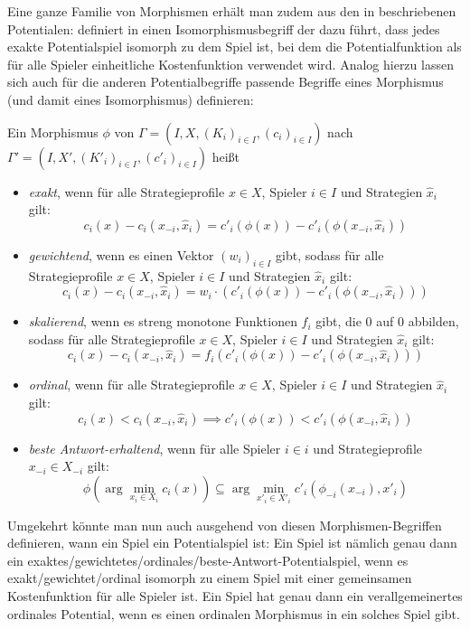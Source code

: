 Eine ganze Familie von Morphismen erhält man zudem aus den in  beschriebenen Potentialen: \citeauthor{ReprOfFiniteGamesAsNCG} definiert in \cite{ReprOfFiniteGamesAsNCG} einen Isomorphismusbegriff der dazu führt, dass jedes exakte Potentialspiel isomorph zu dem Spiel ist, bei dem die Potentialfunktion als für alle Spieler einheitliche Kostenfunktion verwendet wird. Analog hierzu lassen sich auch für die anderen Potentialbegriffe passende Begriffe eines Morphismus (und damit eines Isomorphismus) definieren:

\begin{defn}\label{def:PotentialMorphismen}
	Ein Morphismus $\phi$ von $\Gamma = (I, X, (K_i)_{i\in I}, (c_i)_{i\in I})$ nach $\Gamma' = (I, X', (K'_i)_{i\in I}, (c'_i)_{i\in I})$ heißt
	\begin{itemize}
		\item \emph{exakt}, wenn für alle Strategieprofile $x \in X$, Spieler $i \in I$ und Strategien $\hat{x}_i$ gilt:
			\[c_i(x) - c_i(x_{-i}, \hat{x}_i) = c'_i(\phi(x)) - c'_i(\phi(x_{-i}, \hat{x}_i))\]
		\item \emph{gewichtend}, wenn es einen Vektor $(w_i)_{i \in I}$ gibt, sodass für alle Strategieprofile $x \in X$, Spieler $i \in I$ und Strategien $\hat{x}_i$ gilt:
			\[c_i(x) - c_i(x_{-i}, \hat{x}_i) = w_i\cdot\left(c'_i(\phi(x)) - c'_i(\phi(x_{-i}, \hat{x}_i))\right)\]
		\item \emph{skalierend}, wenn es streng monotone Funktionen $f_i$ gibt, die $0$ auf $0$ abbilden, sodass für alle Strategieprofile $x \in X$, Spieler $i \in I$ und Strategien $\hat{x}_i$ gilt:
			\[c_i(x) - c_i(x_{-i}, \hat{x}_i) = f_i(c'_i(\phi(x)) - c'_i(\phi(x_{-i}, \hat{x}_i)))\]
		\item \emph{ordinal}, wenn für alle Strategieprofile $x \in X$, Spieler $i \in I$ und Strategien $\hat{x}_i$ gilt:
			\[c_i(x) < c_i(x_{-i}, \hat{x}_i) \implies c'_i(\phi(x)) < c'_i(\phi(x_{-i}, \hat{x}_i))\]
		\item \emph{beste Antwort-erhaltend}, wenn für alle Spieler $i \in i$ und Strategieprofile $x_{-i} \in X_{-i}$ gilt:
			\[\phi(\arg \min_{x_i \in X_i}c_i(x)) \subseteq \arg \min_{x'_i \in X'_i} c'_i(\phi_{-i}(x_{-i}), x'_i)\]
	\end{itemize}	
\end{defn}

\begin{bem}
	Umgekehrt könnte man nun auch ausgehend von diesen Morphismen-Begriffen definieren, wann ein Spiel ein Potentialspiel ist: Ein Spiel ist nämlich genau dann ein exaktes/gewichtetes/ordinales/beste-Antwort-Potentialspiel, wenn es exakt/gewichtet/ordinal isomorph zu einem Spiel mit einer gemeinsamen Kostenfunktion für alle Spieler ist. Ein Spiel hat genau dann ein verallgemeinertes ordinales Potential, wenn es einen ordinalen Morphismus in ein solches Spiel gibt.
\end{bem}

